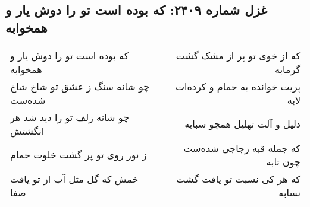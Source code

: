 \begin{center}
\section*{غزل شماره ۲۴۰۹: که بوده است تو را دوش یار و همخوابه}
\label{sec:2409}
\begin{longtable}{l p{0.5cm} r}
که بوده است تو را دوش یار و همخوابه
&&
که از خوی تو پر از مشک گشت گرمابه
\\
چو شانه سنگ ز عشق تو شاخ شاخ شده‌ست
&&
پریت خوانده به حمام و کرده‌ات لابه
\\
چو شانه زلف تو را دید شد هر انگشتش
&&
دلیل و آلت تهلیل همچو سبابه
\\
ز نور روی تو پر گشت خلوت حمام
&&
که جمله قبه زجاجی شده‌ست چون تابه
\\
خمش که گل مثل آب از تو یافت صفا
&&
که هر کی نسبت تو یافت گشت نسابه
\\
\end{longtable}
\end{center}
